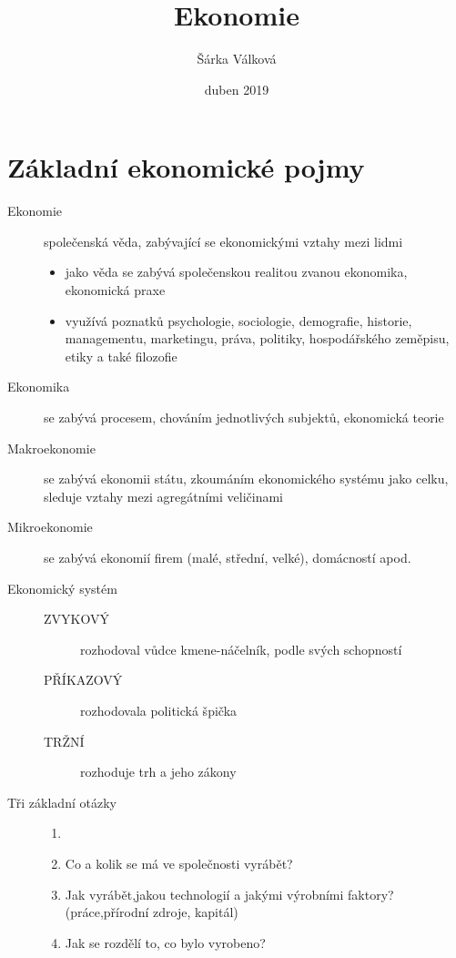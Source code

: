 \documentclass[12pt,a4paper,twoside]{book}
\title{Ekonomie}
\author{Šárka Válková}
\date{duben 2019}
\begin{document}
\maketitle
\newpage
{}
\frenchspacing

\mainmatter

\chapter{Základní ekonomické pojmy}

\begin{description}
	\item[Ekonomie] společenská věda, zabývající se ekonomickými vztahy mezi lidmi
	\begin{itemize}
		\item jako věda se zabývá společenskou realitou zvanou ekonomika, ekonomická praxe
		\item využívá poznatků psychologie, sociologie, demografie, historie, managementu, marketingu, práva, politiky, hospodářského zeměpisu, etiky a také filozofie
	\end{itemize}
	\item[Ekonomika] se zabývá procesem, chováním jednotlivých subjektů, ekonomická teorie
	\item[Makroekonomie] se zabývá ekonomii státu, zkoumáním ekonomického systému jako celku, sleduje vztahy mezi agregátními veličinami
	\item[Mikroekonomie] se zabývá ekonomií firem (malé, střední, velké), domácností apod.
	\item[Ekonomický systém]
	\begin{description}
		\item[]
		\item[ZVYKOVÝ] rozhodoval vůdce kmene-náčelník, podle svých schopností
		\item[PŘÍKAZOVÝ] rozhodovala politická špička
		\item[TRŽNÍ] rozhoduje trh a jeho zákony
	\end{description}
	\item[Tři základní otázky]
	\begin{enumerate}
	\item[]
	\item Co a kolik se má ve společnosti vyrábět?
	\item Jak vyrábět,jakou technologií a jakými výrobními faktory?(práce,přírodní zdroje, kapitál)
	\item Jak se rozdělí to, co bylo vyrobeno?

\end{enumerate}
\end{description}
\end{document}
